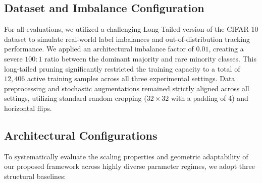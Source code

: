\documentclass[conference]{IEEEtran}
\begin{document}
\subsection{Dataset and Imbalance Configuration}
For all evaluations, we utilized a challenging Long-Tailed
version of the CIFAR-10 dataset to simulate real-world label imbalances and out-of-distribution tracking performance. We
applied an architectural imbalance factor of $0.01$, creating a severe
$100:1$ ratio between the dominant majority and rare minority classes. This long-tailed pruning significantly restricted
the training capacity to a total of $12{,}406$ active training samples
across all three experimental settings. Data preprocessing and stochastic augmentations remained strictly aligned across all settings, utilizing standard random cropping ($32\times32$
with a padding of 4) and horizontal flips.

\subsection{Architectural Configurations}
\label{subsec:architectures}

To systematically evaluate the scaling properties and geometric adaptability of our proposed framework across highly diverse parameter regimes, we adopt three structural baselines:
\end{document}
